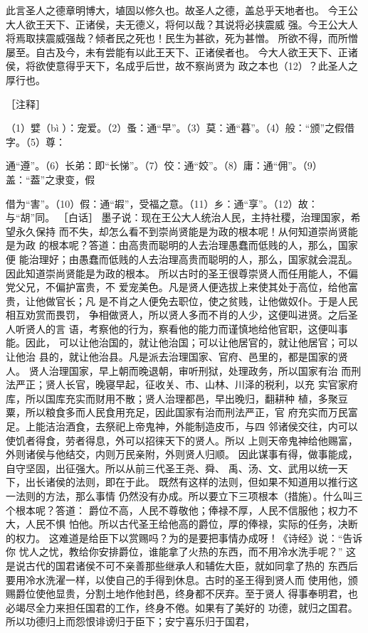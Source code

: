 \documentclass[12pt,UTF8]{ctexbook}
\begin{document}
此言圣人之德章明博大，埴固以修久也。故圣人之德，盖总乎天地者也。 
今王公大人欲王天下、正诸侯，夫无德义，将何以哉？其说将必挟震威 
强。今王公大人将焉取挟震威强哉？倾者民之死也！民生为甚欲，死为甚憎。 
所欲不得，而所憎屡至。自古及今，未有尝能有以此王天下、正诸侯者也。 
今大人欲王天下、正诸侯，将欲使意得乎天下，名成乎后世，故不察尚贤为 
政之本也（12）？此圣人之厚行也。 


［注释］ 

（1）嬖（bì 
）：宠爱。（2）蚤：通“早”。（3）莫：通“暮”。（4）般：“颁”之假借字。（5）尊： 

通“遵”。（6）长弟：即“长悌”。（7）佼：通“姣”。（8）庸：通“佣”。（9）盖：“葢”之隶变，假 

借为“害”。（10）假：通“嘏”，受福之意。（11）乡：通“享”。（12）故：与“胡”同。 
［白话］ 
墨子说：现在王公大人统治人民，主持社稷，治理国家，希望永久保持 
而不失，却怎么看不到崇尚贤能是为政的根本呢！从何知道崇尚贤能是为政 
的根本呢？答道：由高贵而聪明的人去治理愚蠢而低贱的人，那么，国家便 
能治理好；由愚蠢而低贱的人去治理高贵而聪明的人，那么，国家就会混乱。 
因此知道崇尚贤能是为政的根本。 
所以古时的圣王很尊崇贤人而任用能人，不偏党父兄，不偏护富贵，不 
爱宠美色。凡是贤人便选拔上来使其处于高位，给他富贵，让他做官长；凡 
是不肖之人便免去职位，使之贫贱，让他做奴仆。于是人民相互劝赏而畏罚， 
争相做贤人，所以贤人多而不肖的人少，这便叫进贤。之后圣人听贤人的言 
语，考察他的行为，察看他的能力而谨慎地给他官职，这便叫事能。因此， 
可以让他治国的，就让他治国；可以让他居官的，就让他居官；可以让他治 
县的，就让他治县。凡是派去治理国家、官府、邑里的，都是国家的贤人。 
贤人治理国家，早上朝而晚退朝，审听刑狱，处理政务，所以国家有治 
而刑法严正；贤人长官，晚寝早起，征收关、市、山林、川泽的税利，以充 
实官家府库，所以国库充实而财用不散；贤人治理都邑，早出晚归，翻耕种 
植，多聚豆粟，所以粮食多而人民食用充足，因此国家有治而刑法严正，官 
府充实而万民富足。上能洁治酒食，去祭祀上帝鬼神，外能制造皮币，与四 
邻诸侯交往，内可以使饥者得食，劳者得息，外可以招徕天下的贤人。所以 
上则天帝鬼神给他赐富，外则诸侯与他结交，内则万民亲附，外则贤人归顺。 
因此谋事有得，做事能成，自守坚固，出征强大。所以从前三代圣王尧、舜、 
禹、汤、文、武用以统一天下，出长诸侯的法则，即在于此。 
既然有这样的法则，但如果不知道用以推行这一法则的方法，那么事情 
仍然没有办成。所以要立下三项根本（措施）。什么叫三个根本呢？答道： 
爵位不高，人民不尊敬他；俸禄不厚，人民不信服他；权力不大，人民不惧 
怕他。所以古代圣王给他高的爵位，厚的俸禄，实际的任务，决断的权力。 
这难道是给臣下以赏赐吗？为的是要把事情办成呀！《诗经》说：“告诉你 
忧人之忧，教给你安排爵位，谁能拿了火热的东西，而不用冷水洗手呢？” 
这是说古代的国君诸侯不可不亲善那些继承人和辅佐大臣，就如同拿了热的 
东西后要用冷水洗濯一样，以使自己的手得到休息。古时的圣王得到贤人而 
使用他，颁赐爵位使他显贵，分割土地作他封邑，终身都不厌弃。至于贤人 
得事奉明君，也必竭尽全力来担任国君的工作，终身不倦。如果有了美好的 
功德，就归之国君。所以功德归上而怨恨诽谤归于臣下；安宁喜乐归于国君， 
\end{document}
